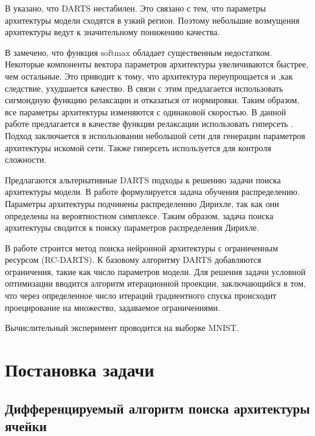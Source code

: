 \documentclass[12pt, twoside]{article}
\begin{document}
В \cite{journals/corr/abs-2002-05283} указано, что DARTS нестабилен. Это связано с тем, что параметры архитектуры модели сходятся в узкий регион. Поэтому небольшие возмущения архитектуры ведут к значительному понижению качества.

В \cite{journals/corr/abs-1911-12126} замечено, что функция $\text{softmax}$ обладает существенным недостатком. Некоторые компоненты вектора параметров архитектуры увеличиваются быстрее, чем остальные. Это приводит к тому, что архитектура переупрощается и ,как следствие, ухудшается качество\cite{journals/corr/abs-1911-12126}. В связи с этим предлагается использовать сигмоидную  функцию релаксации и отказаться от нормировки. Таким образом, все параметры архитектуры изменяются с одинаковой скоростью. В данной работе предлагается в качестве функции релаксации использовать гиперсеть \cite{journals/corr/HaDL16}. Подход заключается в использовании небольшой сети для генерации параметров архитектуры искомой сети. Также гиперсеть используется для контроля сложности.

 Предлагаются альтернативные DARTS подходы к решению задачи поиска архитектуры модели. В работе \cite{journals/corr/abs-2006-10355} формулируется задача обучения распределению. Параметры архитектуры подчинены распределению Дирихле, так как они определены на вероятностном симплексе. Таким образом, задача поиска архитектуры сводится к поиску параметров распределения Дирихле.

В работе \cite{journals/corr/abs-1912-12814} строится метод поиска нейронной архитектуры с ограниченным ресурсом (RC-DARTS). К базовому алгоритму DARTS добавляются ограничения, такие как число параметров модели. Для решения задачи условной оптимизации вводится алгоритм итерационной проекции, заключающийся в том, что через определенное число итераций градиентного спуска происходит проецирование на множество, задаваемое ограничениями.


Вычислительный эксперимент проводится на выборке MNIST\cite{lecun-mnisthandwrittendigit-2010}.

\section{Постановка задачи}

\subsection{Дифференцируемый алгоритм поиска архитектуры ячейки}
\end{document}
